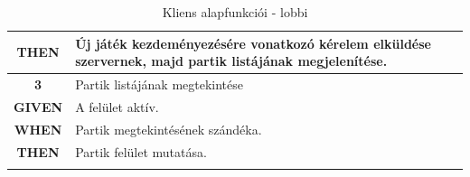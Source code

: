 \documentclass[twoside, a4paper, 12pt]{article}
\begin{document}
\begin{longtable}[c]{|c|p{14cm}|}
	\textbf{THEN} &
	Új játék kezdeményezésére vonatkozó kérelem elküldése szervernek, majd partik listájának megjelenítése.
	\\
	\hline
	
	\rowcolor[HTML]{CBCEFB} 
	\textbf{3}
	&	Partik listájának megtekintése
	\\ \nobreakhline
	
	\textbf{GIVEN} &
	A felület aktív.
	\\ \nobreakhline
	
	\textbf{WHEN} &
	Partik megtekintésének szándéka.
	\\
	\nobreakhline
	
	\textbf{THEN} &
	Partik felület mutatása.
	\\
	\hline
	\caption{Kliens alapfunkciói - lobbi}
	\label{userStories:client:lobby}\\
\end{longtable}
\end{document}
